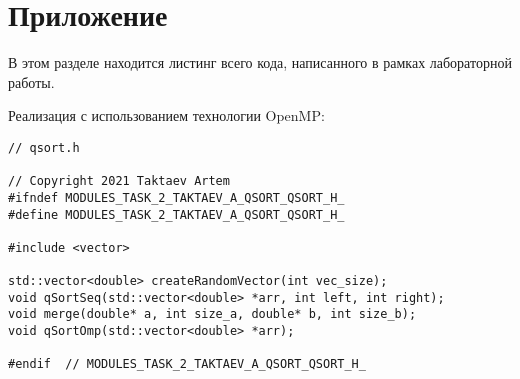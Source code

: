 \documentclass{report}
\begin{document}
\section*{Приложение}
В этом разделе находится листинг всего кода, написанного в рамках лабораторной работы.
\par Реализация с использованием технологии OpenMP:
\begin{lstlisting}
// qsort.h

// Copyright 2021 Taktaev Artem
#ifndef MODULES_TASK_2_TAKTAEV_A_QSORT_QSORT_H_
#define MODULES_TASK_2_TAKTAEV_A_QSORT_QSORT_H_

#include <vector>

std::vector<double> createRandomVector(int vec_size);
void qSortSeq(std::vector<double> *arr, int left, int right);
void merge(double* a, int size_a, double* b, int size_b);
void qSortOmp(std::vector<double> *arr);

#endif  // MODULES_TASK_2_TAKTAEV_A_QSORT_QSORT_H_

\end{lstlisting}
\end{document}
